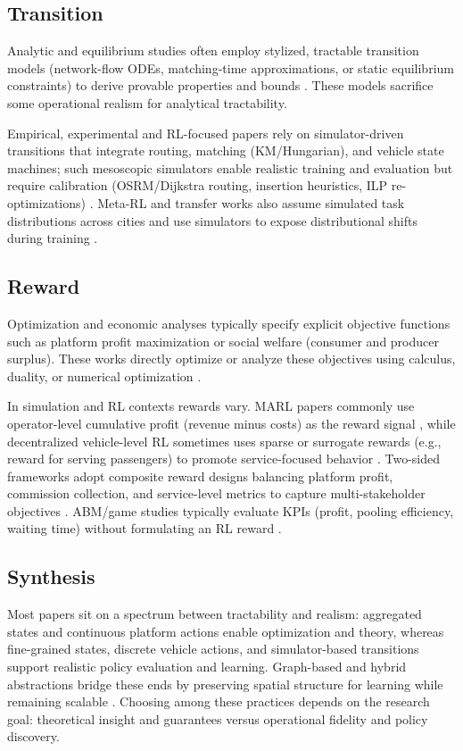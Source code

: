 \subsection{Transition}
Analytic and equilibrium studies often employ stylized, tractable transition models (network-flow ODEs, matching-time approximations, or static equilibrium constraints) to derive provable properties and bounds \citep{spatiotemporal_pricing,geometric_matching,spatial_pricing}. These models sacrifice some operational realism for analytical tractability.

Empirical, experimental and RL-focused papers rely on simulator-driven transitions that integrate routing, matching (KM/Hungarian), and vehicle state machines; such mesoscopic simulators enable realistic training and evaluation but require calibration (OSRM/Dijkstra routing, insertion heuristics, ILP re-optimizations) \citep{competitive_pricing,hybrid_operations,modeling_the_competition,competition_and_cooperation,graph_meta}. Meta-RL and transfer works also assume simulated task distributions across cities and use simulators to expose distributional shifts during training \citep{graph_meta}.

\subsection{Reward}
Optimization and economic analyses typically specify explicit objective functions such as platform profit maximization or social welfare (consumer and producer surplus). These works directly optimize or analyze these objectives using calculus, duality, or numerical optimization \citep{spatiotemporal_pricing,geometric_matching,spatial_pricing}.

In simulation and RL contexts rewards vary. MARL papers commonly use operator-level cumulative profit (revenue minus costs) as the reward signal \citep{competitive_pricing,learning_based,graph_meta}, while decentralized vehicle-level RL sometimes uses sparse or surrogate rewards (e.g., reward for serving passengers) to promote service-focused behavior \citep{samod}. Two-sided frameworks adopt composite reward designs balancing platform profit, commission collection, and service-level metrics to capture multi-stakeholder objectives \citep{two_sided}. ABM/game studies typically evaluate KPIs (profit, pooling efficiency, waiting time) without formulating an RL reward \citep{competition_and_cooperation,modeling_the_competition}.

\subsection{Synthesis}
Most papers sit on a spectrum between tractability and realism: aggregated states and continuous platform actions enable optimization and theory, whereas fine-grained states, discrete vehicle actions, and simulator-based transitions support realistic policy evaluation and learning. Graph-based and hybrid abstractions bridge these ends by preserving spatial structure for learning while remaining scalable \citep{graph_meta,learning_based,competitive_pricing}. Choosing among these practices depends on the research goal: theoretical insight and guarantees versus operational fidelity and policy discovery.
